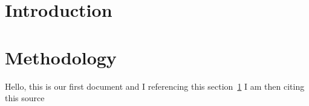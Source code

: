 \documentclass[11pt]{article}
\begin{document}
    \section{Introduction}\label{sec:introduction}

    \section{Methodology}\label{sec:methodology}

    Hello, this is our first document and I referencing this section~\ref{sec:introduction}
    I am then citing this source~\cite{ani2019victory}

    
    
\end{document}
